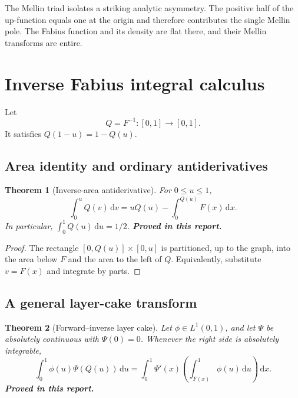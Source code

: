 \documentclass[11pt,oneside]{article}
\numberwithin{equation}{section}
\newtheorem{theorem}{Theorem}[section]
\theoremstyle{definition}
\theoremstyle{remark}
\newcommand{\dd}{\,\mathrm d}
\newcommand{\QF}{Q}
\newcommand{\statusproved}{\textcolor{proofgreen}{\textbf{Proved in this report.}}}
\begin{document}
The Mellin triad isolates a striking analytic asymmetry.  The positive half of
the up-function equals one at the origin and therefore contributes the single
Mellin pole.  The Fabius function and its density are flat there, and their
Mellin transforms are entire.

\section{Inverse Fabius integral calculus}
\label{sec:inverse}

Let
\begin{equation}
 \QF=F^{-1}:[0,1]\to[0,1].
 \label{eq:Qdef}
\end{equation}
It satisfies \(\QF(1-u)=1-\QF(u)\).

\subsection{Area identity and ordinary antiderivatives}

\begin{theorem}[Inverse-area antiderivative]
\label{thm:inverse-area}
For \(0\le u\le1\),
\begin{equation}
 \boxed{\int_0^u\QF(v)\dd v
 =u\QF(u)-\int_0^{\QF(u)}F(x)\dd x.}
 \label{eq:inverse-area}
\end{equation}
In particular, \(\int_0^1\QF(u)\dd u=1/2\).  \statusproved
\end{theorem}

\begin{proof}
The rectangle \([0,\QF(u)]\times[0,u]\) is partitioned, up to the graph, into
the area below \(F\) and the area to the left of \(\QF\).  Equivalently,
substitute \(v=F(x)\) and integrate by parts.
\end{proof}

\subsection{A general layer-cake transform}

\begin{theorem}[Forward--inverse layer cake]
\label{thm:inverse-layercake}
Let \(\phi\in L^1(0,1)\), and let \(\Psi\) be absolutely continuous with
\(\Psi(0)=0\).  Whenever the right side is absolutely integrable,
\begin{equation}
 \boxed{
 \int_0^1\phi(u)\Psi(\QF(u))\dd u
 =\int_0^1\Psi'(x)\left(\int_{F(x)}^1\phi(u)\dd u\right)\dd x.}
 \label{eq:inverse-layercake}
\end{equation}
\statusproved
\end{theorem}
\end{document}
